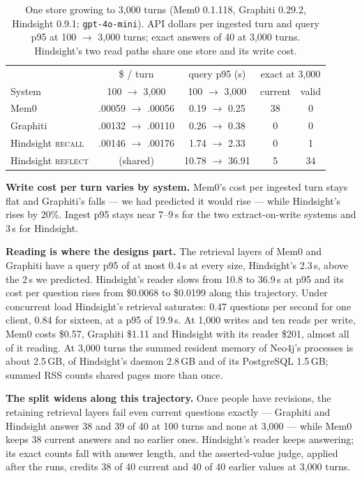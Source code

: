 \documentclass[conference]{IEEEtran}
\begin{document}
\begin{table}[t]
\centering
\caption{One store growing to 3{,}000 turns (Mem0 0.1.118, Graphiti 0.29.2,
Hindsight 0.9.1; \texttt{gpt-4o-mini}). API dollars per
ingested turn and query p95 at 100 $\to$ 3{,}000 turns; exact answers of 40 at
3{,}000 turns. Hindsight's two read paths share one store and its write cost.}
\label{tab:growth}
\footnotesize
\setlength{\tabcolsep}{2.2pt}
\begin{tabular}{@{}lcccc@{}}
\toprule
 & \$ / turn & query p95 (s) & \multicolumn{2}{c}{exact at 3{,}000} \\
System & 100 $\to$ 3{,}000 & 100 $\to$ 3{,}000 & current & valid \\
\midrule
Mem0                & .00059 $\to$ .00056 & 0.19 $\to$ 0.25 & 38 & 0 \\
Graphiti            & .00132 $\to$ .00110 & 0.26 $\to$ 0.38 & 0  & 0 \\
Hindsight \textsc{recall}  & .00146 $\to$ .00176 & 1.74 $\to$ 2.33 & 0  & 1 \\
Hindsight \textsc{reflect} & (shared)           & 10.78 $\to$ 36.91 & 5 & 34 \\
\bottomrule
\end{tabular}
\end{table}

\textbf{Write cost per turn varies by system.} Mem0's cost per ingested turn stays
flat and Graphiti's falls --- we had predicted it would rise --- while
Hindsight's rises by 20\%. Ingest p95 stays near 7--9\,s for the two
extract-on-write systems and 3\,s for Hindsight.

\textbf{Reading is where the designs part.} The retrieval layers of Mem0 and
Graphiti have a query p95 of at most 0.4\,s at every size, Hindsight's 2.3\,s, above the
2\,s we predicted. Hindsight's reader slows from 10.8 to 36.9\,s at p95 and its
cost per question rises from \$0.0068 to \$0.0199 along this trajectory. Under
concurrent load Hindsight's retrieval saturates: 0.47 questions per second for
one client, 0.84 for sixteen, at a p95 of 19.9\,s. At 1{,}000 writes and ten
reads per write, Mem0 costs \$0.57, Graphiti \$1.11 and Hindsight with its
reader \$201, almost all of it reading. At 3{,}000 turns the summed resident
memory of Neo4j's processes is about 2.5\,GB, of Hindsight's daemon 2.8\,GB and
of its PostgreSQL 1.5\,GB; summed RSS counts shared pages more than once.

\textbf{The split widens along this trajectory.} Once people have revisions, the
retaining retrieval layers fail even current questions exactly --- Graphiti and
Hindsight answer 38 and 39 of 40 at 100 turns and none at 3{,}000 --- while Mem0
keeps 38 current answers and no earlier ones. Hindsight's reader keeps
answering; its exact counts fall with answer length, and the asserted-value
judge, applied after the runs, credits 38 of 40 current and 40 of 40 earlier
values at 3{,}000 turns.
\end{document}

